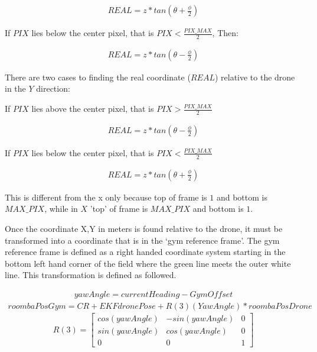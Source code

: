 \documentclass[12pt,letterpaper]{article}
\newcommand\tab[1][1cm]{\hspace*{#1}}
\begin{document}
						\begin{align*}
						REAL = z * tan(\theta + \frac{\phi}{2})
						\end{align*}

						\tab If $PIX$ lies below the center pixel, that is $PIX < \frac{PIX\_MAX}{2}$, Then:

						\begin{align*}
						REAL = z * tan(\theta - \frac{\phi}{2})
						\end{align*}

				There are two cases to finding the real coordinate ($REAL$) relative to the drone in the $Y$ direction:

						\tab If $PIX$ lies above the center pixel, that is $PIX > \frac{PIX\_MAX}{2}$

						\begin{align*}
						REAL = z * tan(\theta - \frac{\phi}{2})
						\end{align*}

						\tab If $PIX$ lies below the center pixel, that is $PIX < \frac{PIX\_MAX}{2}$

						\begin{align*}
						REAL = z * tan(\theta + \frac{\phi}{2})
						\end{align*}

				This is different from the x only because top of frame is $1$ and bottom is $MAX\_PIX$, while in $X$ 'top' of frame is $MAX\_PIX$ and bottom is $1$. 

		Once the coordinate X,Y in meters is found relative to the drone, it must be transformed into a coordinate that is in the ‘gym reference frame’. The gym reference frame is defined as a right handed coordinate system starting in the bottom left hand corner of the field where the green line meets the outer white line. This transformation is defined as followed. 
		
		\begin{align*}
		yawAngle = currentHeading - GymOffset
		\end{align*}
		\begin{align*}
		roombaPosGym = CR + EKFdronePose + R(3)(YawAngle)*roombaPosDrone 
		\end{align*}
		\[
		R(3) = 
			\begin{bmatrix}
			cos(yawAngle) & -sin(yawAngle) & 0 \\
			sin(yawAngle) & cos(yawAngle)  & 0 \\
			0 & 0 & 1 
			\end{bmatrix}
		\]
	
\end{document}
